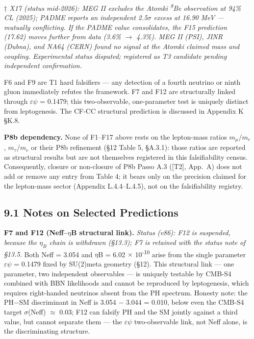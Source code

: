 \documentclass[11pt,letterpaper]{article}
\begin{document}
{\footnotesize \noindent \textit{$\dagger$ X17 (status mid-2026): MEG II excludes the Atomki \textsuperscript{8}Be observation at 94\% CL (2025); PADME reports an independent 2.5$\sigma$ excess at 16.90 MeV --- mutually conflicting. If the PADME value consolidates, the F15 prediction (17.62) moves further from data (3.6\% $\to$ 4.3\%). MEG II (PSI), JINR (Dubna), and NA64 (CERN) found no signal at the Atomki claimed mass and coupling. Experimental status disputed; registered as T3 candidate pending independent confirmation.}\par}

\noindent F6 and F9 are T1 hard falsifiers --- any detection of a fourth neutrino or ninth gluon immediately refutes the framework. F7 and F12 are structurally linked through $\varepsilon$$\psi$ = 0.1479; this two-observable, one-parameter test is uniquely distinct from leptogenesis. The CF-CC structural prediction is discussed in Appendix K §K.8.

\noindent \textbf{P8b dependency.} None of F1--F17 above rests on the lepton-mass ratios $m_\mu/m_e$, $m_\tau/m_e$ or their P8b refinement (§12 Table 5, §A.3.1): those ratios are reported as structural results but are not themselves registered in this falsifiability census. Consequently, closure or non-closure of P8b Passo A.3 ([T2], App.~A) does not add or remove any entry from Table 4; it bears only on the precision claimed for the lepton-mass sector (Appendix L.4.4--L.4.5), not on the falsifiability registry.

\subsection*{9.1  Notes on Selected Predictions}

\noindent \textbf{F7 and F12 (Neff--$\eta$B structural link). }\emph{Status (v86): F12 is suspended, because the $\eta_B$ chain is withdrawn (§13.3); F7 is retained with the status note of §13.5.} Both Neff = 3.054 and $\eta$B = 6.02 $\times$ 10\textsuperscript{-10} arise from the single parameter $\varepsilon$$\psi$ = 0.1479 fixed by SU(2)meta geometry (§12). This structural link --- one parameter, two independent observables --- is uniquely testable by CMB-S4 combined with BBN likelihoods and cannot be reproduced by leptogenesis, which requires right-handed neutrinos absent from the PH spectrum. Honesty note: the PH$-$SM discriminant in Neff is 3.054 $-$ 3.044 = 0.010, below even the CMB-S4 target $\sigma$(Neff) $\approx$ 0.03; F12 can falsify PH and the SM jointly against a third value, but cannot separate them --- the $\varepsilon$$\psi$ two-observable link, not Neff alone, is the discriminating structure.
\end{document}
